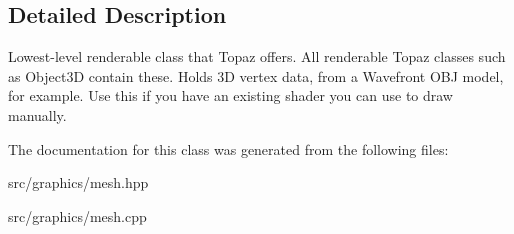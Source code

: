 \subsection{Detailed Description}
Lowest-\/level renderable class that Topaz offers. All renderable Topaz classes such as Object3D contain these. Holds 3D vertex data, from a Wavefront O\+BJ model, for example. Use this if you have an existing shader you can use to draw manually. 

The documentation for this class was generated from the following files\+:\begin{DoxyCompactItemize}
\item 
src/graphics/mesh.\+hpp\item 
src/graphics/mesh.\+cpp\end{DoxyCompactItemize}
